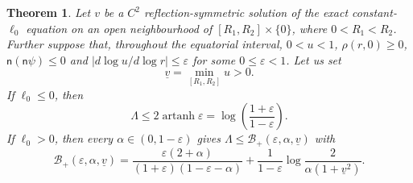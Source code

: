 \documentclass[amsmath,amsfonts,amssymb,aps,pra,superscriptaddress,10pt]{revtex4-2}
\numberwithin{equation}{section}
\theoremstyle{plain}
\newtheorem{theorem}{Theorem}
\theoremstyle{definition}
\theoremstyle{remark}
\theoremstyle{definition}
\newcommand{\ellzero}{\ell_0}
\begin{document}
\begin{theorem}\label{quantapproxflatnogo}
Let $v$ be a $C^2$ reflection-symmetric solution of the exact constant-$\ellzero$ equation on an open neighbourhood of $[R_1,R_2]\times\{0\}$, where $0<R_1<R_2$. Further suppose that, throughout the equatorial interval, $0<u<1$, $\rho(r,0)\geq 0$, $\mathsf{n}(\mathsf{n}\psi)\leq 0$  and $|d\log{u}/d\log{r}|\leq\varepsilon$ for some $0\leq\varepsilon<1$. Let us set
\begin{equation}\label{vunder}
\underline{v}=\min_{[R_1,R_2]}u>0.
\end{equation}
If $\ellzero\leq 0$, then
\begin{equation}\label{approxfbnonp}
\Lambda\leq 2\operatorname{artanh}{\varepsilon}
=\log{\left(\frac{1+\varepsilon}{1-\varepsilon}\right)}.
\end{equation}
If $\ellzero>0$, then every $\alpha\in(0,1-\varepsilon)$ gives $\Lambda\leq \mathcal{B}_+(\varepsilon,\alpha,\underline{v})$ with
\begin{equation}\label{approxfbposell}
\mathcal{B}_+(\varepsilon,\alpha,\underline{v})=\frac{\varepsilon(2+\alpha)}
{(1+\varepsilon)(1-\varepsilon-\alpha)}+\frac{1}{1-\varepsilon}
\log{\frac{2}{\alpha(1+\underline{v}^2)}}.
\end{equation}
\end{theorem}
\end{document}
